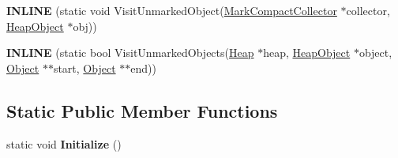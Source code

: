 \begin{DoxyCompactItemize}
\item 
{\bfseries I\+N\+L\+I\+NE} (static void Visit\+Unmarked\+Object(\hyperlink{classv8_1_1internal_1_1_mark_compact_collector}{Mark\+Compact\+Collector} $\ast$collector,                                                                                                                                                           \hyperlink{classv8_1_1internal_1_1_heap_object}{Heap\+Object} $\ast$obj))\hypertarget{classv8_1_1internal_1_1_mark_compact_marking_visitor_a1913113b6705b814932a00f1ce12386d}{}\label{classv8_1_1internal_1_1_mark_compact_marking_visitor_a1913113b6705b814932a00f1ce12386d}

\item 
{\bfseries I\+N\+L\+I\+NE} (static bool Visit\+Unmarked\+Objects(\hyperlink{classv8_1_1internal_1_1_heap}{Heap} $\ast$heap, \hyperlink{classv8_1_1internal_1_1_heap_object}{Heap\+Object} $\ast$object,                                                                                                                                                               \hyperlink{classv8_1_1internal_1_1_object}{Object} $\ast$$\ast$start, \hyperlink{classv8_1_1internal_1_1_object}{Object} $\ast$$\ast$end))\hypertarget{classv8_1_1internal_1_1_mark_compact_marking_visitor_a6b7acc7accf0b906e9a7b3ab70e085bf}{}\label{classv8_1_1internal_1_1_mark_compact_marking_visitor_a6b7acc7accf0b906e9a7b3ab70e085bf}

\end{DoxyCompactItemize}
\subsection*{Static Public Member Functions}
\begin{DoxyCompactItemize}
\item 
static void {\bfseries Initialize} ()\hypertarget{classv8_1_1internal_1_1_mark_compact_marking_visitor_a18c90a12328b7b57b1edfa1ef6c12326}{}\label{classv8_1_1internal_1_1_mark_compact_marking_visitor_a18c90a12328b7b57b1edfa1ef6c12326}

\end{DoxyCompactItemize}
